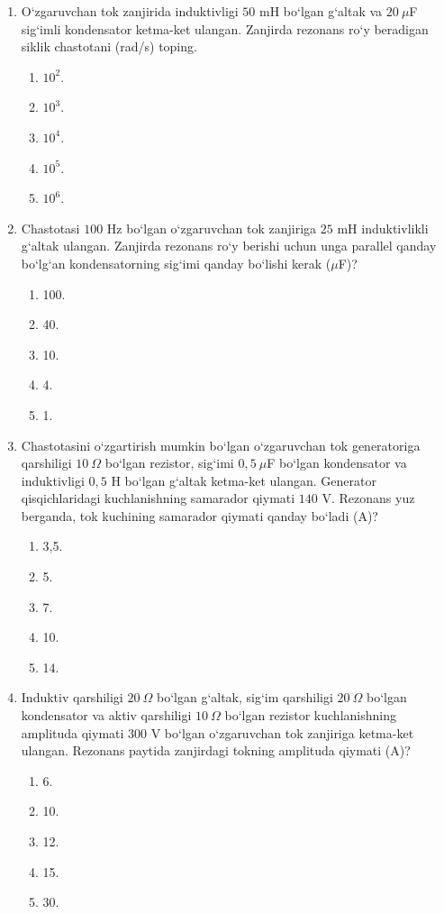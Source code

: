 \begin{enumerate}
\item O‘zgaruvchan tok zanjirida induktivligi $50$ mH bo‘lgan g‘altak va $20~\mu$F sig‘imli kondensator ketma-ket ulangan. Zanjirda rezonans ro‘y beradigan siklik chastotani (rad/s) toping.
\begin{enumerate}[label=\Alph*)]
\item $10^2$.
\item $10^3$.
\item $10^4$.
\item $10^5$.
\item $10^6$.
\end{enumerate}

\item Chastotasi $100$ Hz bo‘lgan o‘zgaruvchan tok zanjiriga $25$ mH induktivlikli g‘altak ulangan. Zanjirda rezonans ro‘y berishi uchun unga parallel qanday bo‘lg‘an kondensatorning sig‘imi qanday bo‘lishi kerak ($\mu$F)?
\begin{enumerate}[label=\Alph*)]
\item 100.
\item 40.
\item 10.
\item 4.
\item 1.
\end{enumerate}

\item Chastotasini o‘zgartirish mumkin bo‘lgan o‘zgaruvchan tok generatoriga qarshiligi $10~\Omega$ bo‘lgan rezistor, sig‘imi $0,5~\mu$F bo‘lgan kondensator va induktivligi $0,5$ H bo‘lgan g‘altak ketma-ket ulangan. Generator qisqichlaridagi kuchlanishning samarador qiymati $140$ V. Rezonans yuz berganda, tok kuchining samarador qiymati qanday bo‘ladi (A)?
\begin{enumerate}[label=\Alph*)]
\item 3,5.
\item 5.
\item 7.
\item 10.
\item 14.
\end{enumerate}

\item Induktiv qarshiligi $20~\Omega$ bo‘lgan g‘altak, sig‘im qarshiligi $20~\Omega$ bo‘lgan kondensator va aktiv qarshiligi $10~\Omega$ bo‘lgan rezistor kuchlanishning amplituda qiymati $300$ V bo‘lgan o‘zgaruvchan tok zanjiriga ketma-ket ulangan. Rezonans paytida zanjirdagi tokning amplituda qiymati (A)?
\begin{enumerate}[label=\Alph*)]
\item 6.
\item 10.
\item 12.
\item 15.
\item 30.
\end{enumerate}


\end{enumerate}
